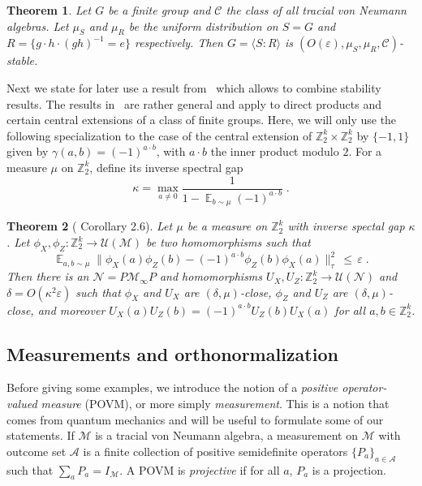 \documentclass[11pt]{article}
\newtheorem{theorem}{Theorem}[section]
\theoremstyle{definition}
\newcommand{\Id}{\ensuremath{I}}
\DeclareMathOperator*{\Expectation}{\mathbb{E}}
\newcommand{\Es}[1]{\Expectation_{#1}}
\newcommand{\Z}{\ensuremath{\mathbb{Z}}}
\newcommand{\mA}{\ensuremath{\mathcal{A}}}
\newcommand{\mC}{\ensuremath{\mathcal{C}}}
\newcommand{\mM}{\ensuremath{\mathcal{M}}}
\newcommand{\mU}{\ensuremath{\mathcal{U}}}
\newcommand{\eps}{\varepsilon}
\newcommand{\mN}{\mathcal{N}}
\begin{document}
\begin{theorem}\label{thm:gh}
Let $G$ be a finite group and $\mC$ the class of all tracial von Neumann algebras. Let $\mu_S$ and $\mu_R$ be the uniform distribution on $S=G$ and $R=\{ g\cdot h \cdot (gh)^{-1}=e \}$ respectively. Then $G=\langle S:R\rangle$ is $(O(\eps),\mu_S,\mu_R,\mC)$-stable.
\end{theorem}

Next we state for later use a result from~\cite{de2022spectral} which allows to combine stability results. The results in~\cite{de2022spectral} are rather general and apply to direct products and certain central extensions of a class of finite groups. Here, we will only use the following specialization to the case of the central extension of $\Z_2^k \times \Z_2^k$ by $\{-1,1\}$ given by $\gamma(a,b)=(-1)^{a\cdot b}$, with $a\cdot b$ the inner product modulo $2$. For a measure $\mu$ on $\Z_2^k$, define its inverse spectral gap 
\[ \kappa = \max_{a\neq 0} \frac{1}{1-\Es{b\sim\mu}(-1)^{a\cdot b}}\;.\] 

\begin{theorem}[\cite{de2022spectral} Corollary 2.6]\label{thm:dls-gap}
Let $\mu$ be a measure on $\Z_2^k$ with inverse spectal gap $\kappa$. Let $\phi_X,\phi_Z: \Z_2^k \to \mU(\mM)$ be two homomorphisms such that
\[ \Es{a,b\sim \mu} \big\| \phi_X(a)\phi_Z(b)-(-1)^{a\cdot b} \phi_Z(b)\phi_X(a)\big\|_\tau^2 \,\leq\,\eps\;.\]
Then there is an $\mN=P\mM_\infty P$ and homomorphisms $U_X,U_Z:\Z_2^k\to\mU(\mN)$ and $\delta=O(\kappa^2\eps)$ such that $\phi_X$ and $U_X$ are $(\delta,\mu)$-close, $\phi_Z$ and $U_Z$ are $(\delta,\mu)$-close, and moreover $U_X(a)U_Z(b)=(-1)^{a\cdot b}U_Z(b)U_X(a)$ for all $a,b\in\Z_2^k$.
\end{theorem}



	\subsection{Measurements and orthonormalization}
	\label{sec:measurements}
	
	Before giving some examples, we introduce the notion of a \emph{positive operator-valued measure} (POVM), or more simply \emph{measurement}. This is a notion that comes from quantum mechanics and will be useful to formulate some of our statements.  
  If $\mM$ is a tracial von Neumann algebra, a measurement on $\mM$ with outcome set $\mA$ is a finite collection of positive semidefinite operators $\{P_a\}_{a\in \mA}$ such that $\sum_a P_a = \Id_\mM$. A POVM is \emph{projective} if for all $a$, $P_a$ is a projection. 
	
\end{document}
